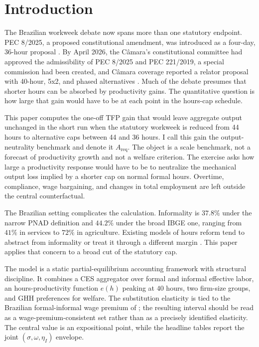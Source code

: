 
\section{Introduction}\label{sec:intro}

The Brazilian workweek debate now spans more than one statutory endpoint. PEC 8/2025, a proposed constitutional amendment, was introduced as a four-day, 36-hour proposal \citep{CamaraPEC82025Protocol}. By April 2026, the C\^amara's constitutional committee had approved the admissibility of PEC 8/2025 and PEC 221/2019, a special commission had been created, and C\^amara coverage reported a relator proposal with 40-hour, 5x2, and phased alternatives \citep{CamaraFortyHours2025,CamaraAdmissibility2026,CamaraSpecialCommission2026}. Much of the debate presumes that shorter hours can be absorbed by productivity gains. The quantitative question is how large that gain would have to be at each point in the hours-cap schedule.

This paper computes the one-off TFP gain that would leave aggregate output unchanged in the short run when the statutory workweek is reduced from 44 hours to alternative caps between 44 and 36 hours. I call this gain the output-neutrality benchmark and denote it $A_{\text{req}}$. The object is a scale benchmark, not a forecast of productivity growth and not a welfare criterion. The exercise asks how large a productivity response would have to be to neutralize the mechanical output loss implied by a shorter cap on normal formal hours. Overtime, compliance, wage bargaining, and changes in total employment are left outside the central counterfactual.

The Brazilian setting complicates the calculation. Informality is $37.8\%$ under the narrow PNAD definition and $44.2\%$ under the broad IBGE one, ranging from $41\%$ in services to $72\%$ in agriculture. Existing models of hours reform tend to abstract from informality \citep{Cacciatore2016} or treat it through a different margin \citep{Ulyssea2018}. This paper applies that concern to a broad cut of the statutory cap.

The model is a static partial-equilibrium accounting framework with structural discipline. It combines a CES aggregator over formal and informal effective labor, an hours-productivity function $e(h)$ peaking at $40$ hours, two firm-size groups, and GHH preferences for welfare. The substitution elasticity is tied to the Brazilian formal-informal wage premium of \citet{MeghirNaritaRobin2015}; the resulting interval should be read as a wage-premium-consistent set rather than as a precisely identified elasticity. The central value is an expositional point, while the headline tables report the joint $(\sigma,\omega,\eta_I)$ envelope.

